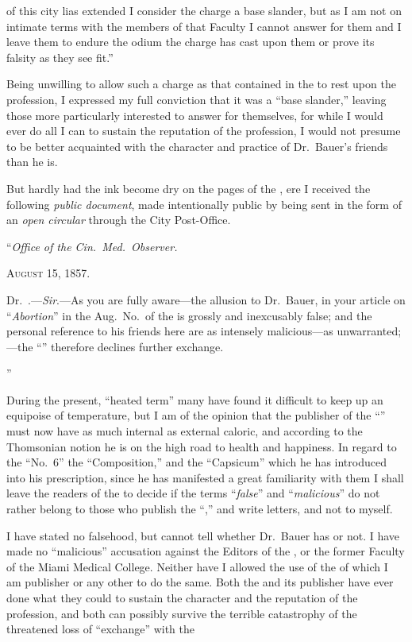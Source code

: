 of this city lias extended I consider the charge a base slander, but as I
am not on intimate terms with the members of that Faculty I cannot
answer for them and I leave them to endure the odium the charge has
cast upon them or prove its falsity as they see fit.''

Being unwilling to allow such a charge as that contained in the
 to rest upon the profession, I expressed my full conviction
that it was a ``base slander,'' leaving those more particularly interested
to answer for themselves, for while I would ever do all I can to sustain
the reputation of the profession, I would not presume to be better
acquainted with the character and practice of Dr.\ Bauer's friends
than he is.

But hardly had the ink become dry on the pages of the , ere
I received the following \emph{public document}, made intentionally public by
being sent in the form of an \emph{open circular} through the City Post-Office.

\hfill{}``\emph{Office of the Cin.\ Med.\ Observer.}\quad

\hfill{}\textsc{August 15, 1857.}\quad

Dr.\ .---\emph{Sir}.---As you are fully aware---the allusion to
Dr.\ Bauer, in your article on ``\emph{Abortion}'' in the Aug.\ No.\ of the
 is grossly and inexcusably false; and the personal
reference to his friends here are as intensely malicious---as unwarranted;---the
``'' therefore declines further exchange.

\hfill{}''\quad

During the present, ``heated term'' many have found it difficult to
keep up an equipoise of temperature, but I am of the opinion that the
publisher of the ``'' must now have as much internal as
external caloric, and according to the Thomsonian notion he is on
the high road to health and happiness. In regard to the ``No.~6'' the
``Composition,'' and the ``Capsicum'' which he has introduced into
his prescription, since he has manifested a great familiarity with them
I shall leave the readers of the  to decide if the terms ``\emph{false}''
and ``\emph{malicious}'' do not rather belong to those who publish the ``,''
and write letters, and not to myself.

I have stated no falsehood, but cannot tell whether Dr.\ Bauer has
or not. I have made no ``malicious'' accusation against the Editors of
the , or the former Faculty of the Miami Medical College.
Neither have I allowed the use of the  of which I am publisher
or any other to do the same. Both the  and
its publisher have ever done what they could to sustain the character
and the reputation of the profession, and both can possibly survive
the terrible catastrophy of the threatened loss of ``exchange'' with the\endinput
